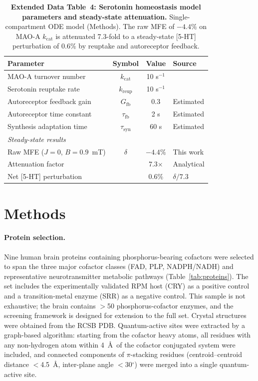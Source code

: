 \documentclass[11pt]{article}
\begin{document}
\begin{table}[p]
\centering
\caption{\textbf{Extended Data Table~4: Serotonin homeostasis model parameters and steady-state attenuation.} Single-compartment ODE model (Methods). The raw MFE of $-4.4\%$ on MAO-A $k_\mathrm{cat}$ is attenuated 7.3-fold to a steady-state [5-HT] perturbation of $0.6\%$ by reuptake and autoreceptor feedback.}
\label{tab:ext_homeostasis}
\small
\begin{tabular}{@{}lccl@{}}
\toprule
Parameter & Symbol & Value & Source \\
\midrule
MAO-A turnover number            & $k_\mathrm{cat}$     & 10 s$^{-1}$   & \cite{Edmondson2004main} \\
Serotonin reuptake rate          & $k_\mathrm{reup}$    & 10 s$^{-1}$   & \cite{Daws2009} \\
Autoreceptor feedback gain       & $G_\mathrm{fb}$      & 0.3           & Estimated \\
Autoreceptor time constant       & $\tau_\mathrm{fb}$   & 2 s           & Estimated \\
Synthesis adaptation time        & $\tau_\mathrm{syn}$  & 60 s          & Estimated \\
\midrule
\multicolumn{4}{l}{\textit{Steady-state results}} \\
Raw MFE ($J = 0$, $B = 0.9$~mT)     & $\delta$          & $-4.4\%$      & This work \\
Attenuation factor               &                   & 7.3$\times$   & Analytical \\
Net [5-HT] perturbation          &                   & $0.6\%$       & $\delta / 7.3$ \\
\bottomrule
\end{tabular}
\end{table}

\section*{Methods}

\paragraph{Protein selection.}
Nine human brain proteins containing phosphorus-bearing cofactors were selected to span the three major cofactor classes (FAD, PLP, NADPH/NADH) and representative neurotransmitter metabolic pathways (Table~\ref{tab:proteins}). The set includes the experimentally validated RPM host (CRY) as a positive control and a transition-metal enzyme (SRR) as a negative control. This sample is not exhaustive; the brain contains $>$50 phosphorus-cofactor enzymes, and the screening framework is designed for extension to the full set. Crystal structures were obtained from the RCSB PDB. Quantum-active sites were extracted by a graph-based algorithm: starting from the cofactor heavy atoms, all residues with any non-hydrogen atom within 4~\AA\ of the cofactor conjugated system were included, and connected components of $\pi$-stacking residues (centroid--centroid distance $<$4.5~\AA, inter-plane angle $<$30$^\circ$) were merged into a single quantum-active site.
\end{document}
